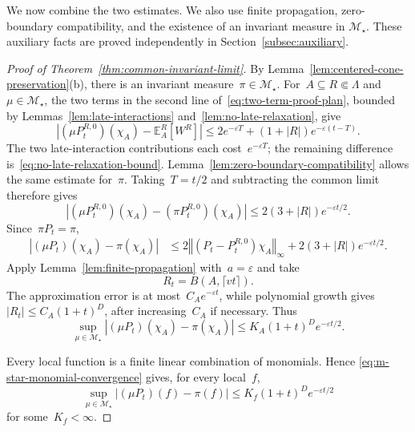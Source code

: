 \documentclass[EJP,preprint,NODS,nobera]{ejpecp}
\newcommand{\E}{\mathbb{E}}
\newcommand{\bb}[1]{\left(#1\right)}
\newcommand{\Cb}[1]{\left[#1\right]}
\newcommand{\norm}[1]{\left\Vert#1\right\Vert}
\newcommand{\abs}[1]{\left|#1\right|}
\newcommand{\rev}[1]{{\color{red}#1}}
\begin{document}
{\color{red}
We now combine the two estimates. We also use finite propagation,
zero-boundary compatibility, and the existence of an invariant measure in
$\mathcal M_\star$. These auxiliary facts are proved independently in
Section~\ref{subsec:auxiliary}.
}

\begin{proof}[Proof of Theorem~\ref{thm:common-invariant-limit}]
{\color{red}
By Lemma~\ref{lem:centered-cone-preservation}(b), there is an invariant
measure~$\pi\in\mathcal M_\star$.
For~$A\subseteq R\Subset\Lambda$ and~$\mu\in\mathcal M_\star$,
the two terms in the second line of~\eqref{eq:two-term-proof-plan}, bounded
by Lemmas~\ref{lem:late-interactions} and~\ref{lem:no-late-relaxation}, give
\begin{equation}
\abs{(\mu P_t^{R,0})(\chi_A)-\E_A^R\Cb{W^R}}
\leq2e^{-\varepsilon T}+(1+\abs R)e^{-\varepsilon(t-T)}.
\label{eq:finite-volume-patch-convergence}
\end{equation}
The two late-interaction contributions each cost~$e^{-\varepsilon T}$;
the remaining difference is~\eqref{eq:no-late-relaxation-bound}.
Lemma~\ref{lem:zero-boundary-compatibility} allows the same estimate for~$\pi$.
Taking~$T=t/2$ and subtracting the common limit therefore gives
\begin{equation*}
\abs{(\mu P_t^{R,0})(\chi_A)-(\pi P_t^{R,0})(\chi_A)}
\leq2(3+\abs R)e^{-\varepsilon t/2}.
\end{equation*}
Since~$\pi P_t=\pi$,
\begin{align}
\abs{(\mu P_t)(\chi_A)-\pi(\chi_A)}
&\leq2\norm{\bb{P_t-P_t^{R,0}}\chi_A}_\infty
 +2(3+\abs R)e^{-\varepsilon t/2}.
\label{eq:infinite-volume-approximation}
\end{align}
Apply Lemma~\ref{lem:finite-propagation} with~$a=\varepsilon$ and take
\begin{equation*}
R_t=B\bb{A,\lceil vt\rceil}.
\end{equation*}
The approximation error is at most~$C_Ae^{-\varepsilon t}$, while polynomial
growth gives~$\abs{R_t}\leq C_A(1+t)^D$, after increasing~$C_A$ if necessary.
Thus
\begin{equation}
\sup_{\mu\in\mathcal M_\star}
\abs{(\mu P_t)(\chi_A)-\pi(\chi_A)}
\leq K_A(1+t)^De^{-\varepsilon t/2}.
\label{eq:m-star-monomial-convergence}
\end{equation}
}

Every local function is a finite linear combination of monomials. Hence
\eqref{eq:m-star-monomial-convergence} \rev{gives},
for every local~$f$,
\begin{equation}
\label{eq:m-star-local-convergence}
\sup_{\mu\in\mathcal M_\star}
\abs{(\mu P_t)(f)-\pi(f)}
\leq
K_f(1+t)^D e^{-\varepsilon t/2}
\end{equation}
for some~$K_f<\infty$.


\end{proof}
\end{document}
